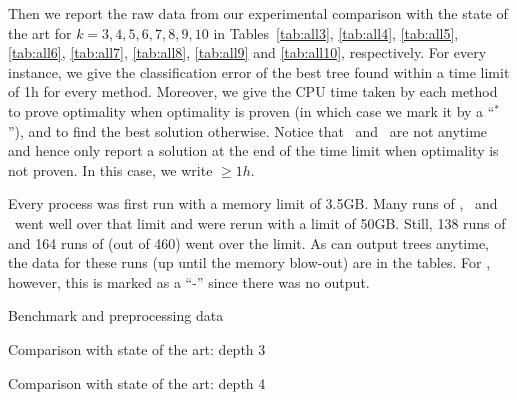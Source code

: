 \documentclass{llncs}
\newcommand{\mdepth}[0]{\ensuremath{k}}
\begin{document}
\medskip

Then we report the raw data from our experimental comparison with the state of the art for $\mdepth=3,4,5,6,7,8,9,10$
in Tables~\ref{tab:all3},
\ref{tab:all4},
\ref{tab:all5},
\ref{tab:all6},
\ref{tab:all7},
\ref{tab:all8},
\ref{tab:all9} and \ref{tab:all10}, respectively.
For every instance, we give the classification error of the best tree found within a time limit of 1h for every method. Moreover, we give the CPU time taken by each method to prove optimality when optimality is proven (in which case we mark it by a ``$^*$''), and to find the best solution otherwise. Notice that \cp\ and \dleight\ are not anytime and hence only report a solution at the end of the time limit when optimality is not proven. In this case, we write $\geq1h$. 

\medskip

Every process was first run with a memory limit of 3.5GB. Many runs of \dleight, \cp\ and \binoct\ went well over that limit and were rerun with a limit of 50GB. Still, 138 runs of \binoct and 164 runs of \dleight (out of 460) went over the limit. As \binoct can output trees anytime, the data for these runs (up until the memory blow-out) are in the tables. For \dleight, however, this is marked as a ``-'' since there was no output.


\renewcommand{\arraystretch}{.9}

\begin{table}[htbp]%
\begin{center}%
\begin{footnotesize}%
\tabcolsep=10pt%
%
\end{footnotesize}%
\end{center}%
\caption{\label{tab:info} Benchmark and preprocessing data}%
\end{table}%

\begin{table}[htbp]%
\begin{center}%
\begin{footnotesize}%
\tabcolsep=2pt%
%
\end{footnotesize}%
\end{center}%
\caption{\label{tab:all3} Comparison with state of the art: depth 3}%
\end{table}%

\begin{table}[htbp]
\begin{center}
\begin{footnotesize}
\tabcolsep=2pt

\end{footnotesize}
\end{center}
\caption{\label{tab:all4} Comparison with state of the art: depth 4}
\end{table}
\end{document}
